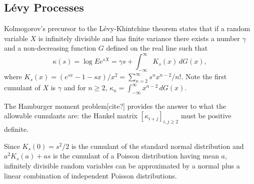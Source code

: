 \documentclass[12pt]{article}
\newcommand{\Var}{\mathop{\rm{Var}}}
\theoremstyle{definition}
\begin{document}
%



\subsection{L\'evy Processes}



Kolmogorov's precursor to the L\'evy-Khintchine theorem\cite{Kol1992}
states that if a random variable \(X\) is infinitely divisible
and has finite variance
there exists a number \(\gamma\) and a non-decreasing function
\(G\) defined on the real line such that
\[
\kappa(s) = \log Ee^{sX} = \gamma s + \int_{-\infty}^\infty K_s(x)\,dG(x),
\]
where \(K_s(x) = (e^{sx} - 1 - sx)/x^2 = \sum_{n=2}^\infty s^nx^{n-2}/n!\).
Note the first cumulant of \(X\) is \(\gamma\) and for \(n\ge 2\),
\(\kappa_n = \int_{-\infty}^\infty x^{n-2}\,dG(x)\).

The Hamburger moment problem[cite?] provides the answer to
what the allowable cumulants are: the Hankel matrix
\([\kappa_{i+j}]_{i,j\ge 2}\) must be positive definite.

Since \(K_s(0) = s^2/2\) is the cumulant of the standard normal
distribution and \(a^2K_s(a) + as\) is the cumulant of a
Poisson distribution having mean \(a\),
infinitely divisible random variables can be
approximated by a normal plus a linear combination of
independent Poisson distributions.

%
\end{document}
